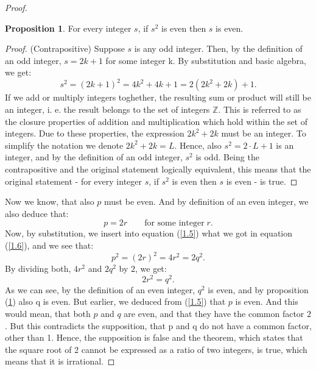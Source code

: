 \documentclass[11pt]{amsart}
\theoremstyle{definition}
\newtheorem{proposition}{Proposition}
\begin{document}
\begin{proof}
    \begin{proposition}\label{2.1}
        For every integer \(s\), if \(s^{2}\) is even then \(s\) is even.
    \end{proposition}
    \begin{proof}
        (Contrapositive) Suppose \(s\) is any odd integer. Then, by the definition of an odd integer, \(s = 2k + 1\) for some integer k. By substitution and basic algebra, we get:
        \begin{equation}
            s^{2} = (2k + 1)^{2} = 4k^{2} + 4k + 1 = 2(2k^{2} + 2k) + 1.
        \end{equation}
        If we add or multiply integers toghether, the resulting sum or product will still be an integer, i. e. the result belongs to the set of integers \(\mathbb{Z}\). This is referred to as the closure properties of addition and multiplication which hold within the set of integers. Due to these properties, the expression \(2k^{2} + 2k\) must be an integer. To simplify the notation we denote \(2k^{2} + 2k = L\). Hence, also \(s^{2} = 2 \cdot L + 1\) is an integer, and by the definition of an odd integer, \(s^{2}\) is odd. Being the contrapositive and the original statement logically equivalent, this means that the original statement - for every integer \(s\), if \(s^{2}\) is even then \(s\) is even - is true.
    \end{proof}
    Now we know, that also \(p\) must be even. And by definition of an even integer, we also deduce that:
    \begin{equation}\label{1.6}
        p = 2r \qquad \text{for some integer} \; r.
    \end{equation}
    Now, by substitution, we insert into equation (\ref{1.5}) what we got in equation (\ref{1.6}), and we see that:
    \begin{equation}\label{1.7}
        p^{2} = (2r)^{2} = 4r^{2} = 2q^{2}.
    \end{equation}
    By dividing both, \(4r^{2}\) and \(2q^{2}\) by \(2\), we get:
    \begin{equation}\label{1.8}
        2r^{2} = q^{2}.
    \end{equation}
    As we can see, by the definition of an even integer, \(q^{2}\) is even, and by proposition (\ref{2.1}) also q is even. But earlier, we deduced from (\ref{1.5}) that \(p\) is even. And this would mean, that both \(p\) and \(q\) are even, and that they have the common factor \(2\). But this contradicts the supposition, that p and q do not have a common factor, other than 1. Hence, the supposition is false and the theorem, which states that the square root of 2 cannot be expressed as a ratio of two integers, is true, which means that it is irrational.
\end{proof}





\printbibliography
\end{document}
